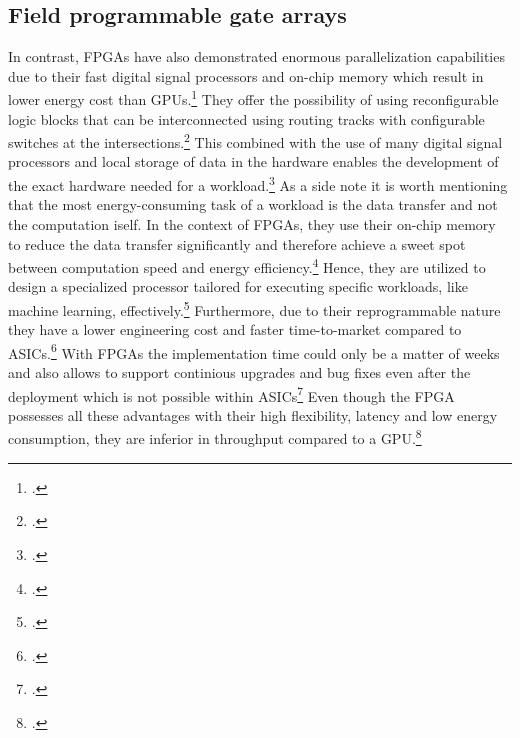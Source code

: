 \subsection{Field programmable gate arrays}
In contrast, \ac{FPGA}s have also demonstrated enormous parallelization capabilities due to their fast digital signal processors and on-chip
memory which result in lower energy cost than GPUs.\footcite[cf.][2693]{ahmadOptimizingHardwareAccelerated2020}
They offer the possibility of using reconfigurable logic blocks that can be interconnected using routing tracks with configurable switches at the intersections.\footcite[cf.][144]{babuReconfigurableFPGAArchitectures2021}
This combined with the use of many digital signal processors and local storage of data in the hardware enables the development of the exact hardware needed for a workload.\footcite[cf.][19]{baischerLearningHardwareTutorial2021}
As a side note it is worth mentioning that the most energy-consuming task of a workload is the data transfer and not the computation iself.
In the context of \ac{FPGA}s, they use their on-chip memory to reduce the data transfer significantly and therefore achieve a sweet spot between computation speed and energy efficiency.\footcite[cf.][101-102]{huSurveyConvolutionalNeural2022}
Hence, they are utilized to design a specialized processor tailored for executing specific workloads, like machine learning, effectively.\footcite[cf.][322]{sipolaArtificialIntelligenceIoT2022}
Furthermore, due to their reprogrammable nature they have a lower engineering cost and faster time-to-market compared to \ac{ASIC}s.\footcite[cf.][4]{boutrosFPGAArchitecturePrinciples2021}
With \ac{FPGA}s the implementation time could only be a matter of weeks and also allows to support continious upgrades and bug fixes even after the deployment which is not possible within \ac{ASIC}s\footcite[cf.][4]{boutrosFPGAArchitecturePrinciples2021}
Even though the \ac{FPGA} possesses all these advantages with their high flexibility, latency and low energy consumption, they are inferior in throughput compared to a \ac{GPU}.\footcite[cf.][100]{huSurveyConvolutionalNeural2022}

